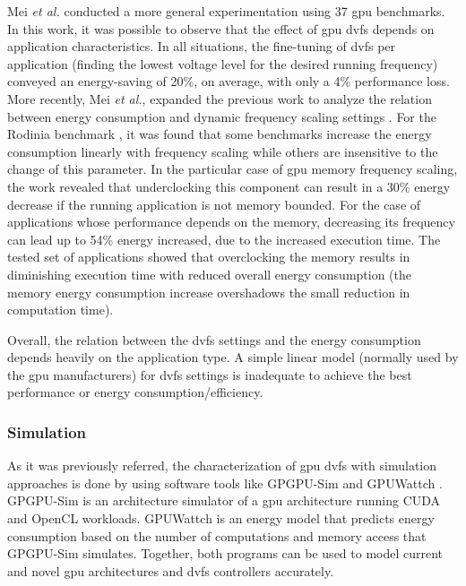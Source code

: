 Mei \textit{et al.} \cite{mei_measurement_2013} conducted a more general experimentation using 37 \acrshort{gpu} benchmarks. In this work, it was possible to observe that the effect of \acrshort{gpu} \acrshort{dvfs} depends on application characteristics. In all situations, the fine-tuning of \acrshort{dvfs} per application (finding the lowest voltage level for the desired running frequency) conveyed an energy-saving of 20\%, on average, with only a 4\% performance loss. More recently, Mei  \textit{et al.}, expanded the previous work to analyze the relation between energy consumption and dynamic frequency scaling settings \cite{mei_survey_2016}. For the  Rodinia benchmark \cite{che_rodinia:_2009}, it was found that some benchmarks increase the energy consumption linearly with frequency scaling while others are insensitive to the change of this parameter. In the particular case of \acrshort{gpu} memory frequency scaling, the work revealed that underclocking this component can result in a 30\% energy decrease if the running application is not memory bounded. For the case of applications whose performance depends on the memory, decreasing its frequency can lead up to 54\% energy increased, due to the increased execution time. The tested set of applications showed that overclocking the memory results in diminishing execution time with reduced overall energy consumption (the memory energy consumption increase overshadows the small reduction in computation time). 

Overall, the relation between the \acrshort{dvfs} settings and the energy consumption depends heavily on the application type. A simple linear model (normally used by the \acrshort{gpu} manufacturers) for \acrshort{dvfs} settings is inadequate to achieve the best performance or energy consumption/efficiency.

\subsubsection{Simulation}

As it was previously referred, the characterization of \acrshort{gpu} \acrshort{dvfs} with simulation approaches is done by using software tools like GPGPU-Sim \cite{noauthor_gpgpu-sim/gpgpu-sim_distribution_2019} and GPUWattch \cite{noauthor_gpu_2011} \cite{leng_gpuwattch:_2013}. GPGPU-Sim is an architecture simulator of a \acrshort{gpu} architecture running CUDA and OpenCL workloads. GPUWattch is an energy model that predicts energy consumption based on the number of computations and memory access that GPGPU-Sim simulates. Together, both programs can be used to model current and novel \acrshort{gpu} architectures and \acrshort{dvfs} controllers accurately.

